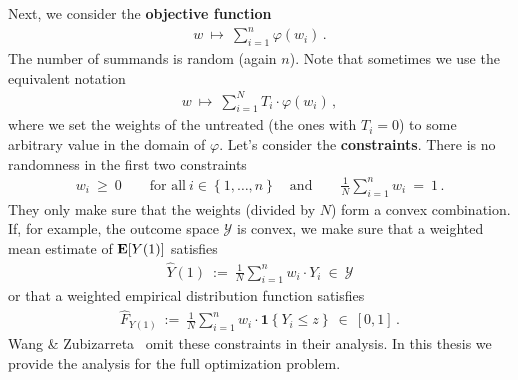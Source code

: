 Next, we consider the \textbf{objective function}
\begin{gather*}
  w
  \ 
  \mapsto
  \ 
    \sum_{i = 1}^{n} 
    \varphi(w_i)
    \,.
\end{gather*}
The number of summands is random (again $n$).
Note that sometimes we use the equivalent notation
\begin{gather*}
  w
  \ 
  \mapsto
  \ 
    \sum_{i = 1}^{N} 
    T_i
    \cdot
    \varphi(w_i)
    \,,
\end{gather*}
where we set the weights of the untreated (the ones with $T_i=0$) to some arbitrary value in the domain of $\varphi$.
Let's consider the \textbf{constraints}. There is no randomness in the first two constraints
\begin{gather*}
    w_i 
    \ 
    \ge
    \ 
    0
    \qquad
    \text{for all}\ 
    i \in \left\{ 1, \ldots, n \right\}
    \quad
    \text{and}
    \qquad
    \frac{1}{N}
    \sum_{i=1}^{n} 
    w_i
    \ 
    =
    \ 
    1
    \,.
\end{gather*}
They only make sure that the weights (divided by $N$) form a convex combination.
If, for example, the outcome space $\mathcal{Y}$ is convex, we make sure that a weighted mean estimate of $\mathbf{E}[Y(1)]$ satisfies
\begin{gather*}
  \widehat{Y}(1) 
  \ 
  :=
  \ 
  \frac{1}{N}
  \sum_{i=1}^{n} 
  w_i\cdot Y_i
  \ 
  \in
  \ 
  \mathcal{Y}
\end{gather*}
or that a weighted empirical distribution function satisfies
\begin{gather*}
  \widehat{F}_{Y(1)} 
  \ 
  :=
  \ 
  \frac{1}{N}
  \sum_{i=1}^{n} 
  w_i\cdot \mathbf{1}\left\{ Y_i\le z \right\}
  \ 
  \in
  \ 
  [0,1]
  \,.
\end{gather*}
Wang \& Zubizarreta~\cite{Wang2019} omit these constraints in their analysis. 
In this thesis we provide the analysis for the full optimization problem.

